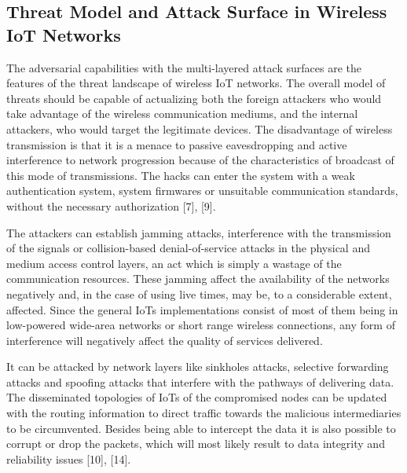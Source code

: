 \documentclass[12pt]{article}
\begin{document}
\subsection{Threat Model and Attack Surface in Wireless IoT Networks}
The adversarial capabilities with the multi-layered attack surfaces are the features of the threat landscape of wireless IoT networks. The overall model of threats should be capable of actualizing both the foreign attackers who would take advantage of the wireless communication mediums, and the internal attackers, who would target the legitimate devices. The disadvantage of wireless transmission is that it is a menace to passive eavesdropping and active interference to network progression because of the characteristics of broadcast of this mode of transmissions. The hacks can enter the system with a weak authentication system, system firmwares or unsuitable communication standards, without the necessary authorization [7], [9].















The attackers can establish jamming attacks, interference with the transmission of the signals or collision-based denial-of-service attacks in the physical and medium access control layers, an act which is simply a wastage of the communication resources. These jamming affect the availability of the networks negatively and, in the case of using live times, may be, to a considerable extent, affected. Since the general IoTs implementations consist of most of them being in low-powered wide-area networks or short range wireless connections, any form of interference will negatively affect the quality of services delivered.















It can be attacked by network layers like sinkholes attacks, selective forwarding attacks and spoofing attacks that interfere with the pathways of delivering data. The disseminated topologies of IoTs of the compromised nodes can be updated with the routing information to direct traffic towards the malicious intermediaries to be circumvented. Besides being able to intercept the data it is also possible to corrupt or drop the packets, which will most likely result to data integrity and reliability issues [10], [14].
\end{document}
